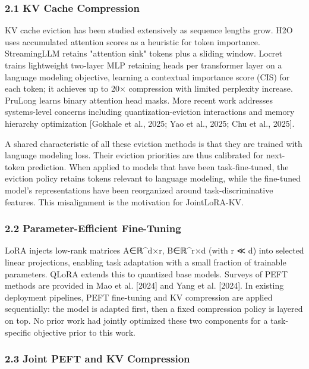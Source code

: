 
\subsubsection{2.1 KV Cache Compression}

KV cache eviction has been studied extensively as sequence lengths grow. H2O \citep{Zhangetal2023} uses accumulated attention scores as a heuristic for token importance. StreamingLLM \citep{Xiaoetal2024} retains "attention sink" tokens plus a sliding window. Locret \citep{Huangetal2024} trains lightweight two-layer MLP retaining heads per transformer layer on a language modeling objective, learning a contextual importance score (CIS) for each token; it achieves up to 20× compression with limited perplexity increase. PruLong \citep{Princeton2024} learns binary attention head masks. More recent work addresses systems-level concerns including quantization-eviction interactions and memory hierarchy optimization [Gokhale et al., 2025; Yao et al., 2025; Chu et al., 2025].

A shared characteristic of all these eviction methods is that they are trained with language modeling loss. Their eviction priorities are thus calibrated for next-token prediction. When applied to models that have been task-fine-tuned, the eviction policy retains tokens relevant to language modeling, while the fine-tuned model's representations have been reorganized around task-discriminative features. This misalignment is the motivation for JointLoRA-KV.

\subsubsection{2.2 Parameter-Efficient Fine-Tuning}

LoRA \citep{Huetal2022} injects low-rank matrices A∈ℝ^{d×r}, B∈ℝ^{r×d} (with r ≪ d) into selected linear projections, enabling task adaptation with a small fraction of trainable parameters. QLoRA \citep{Dettmersetal2023} extends this to quantized base models. Surveys of PEFT methods are provided in Mao et al. [2024] and Yang et al. [2024]. In existing deployment pipelines, PEFT fine-tuning and KV compression are applied sequentially: the model is adapted first, then a fixed compression policy is layered on top. No prior work had jointly optimized these two components for a task-specific objective prior to this work.

\subsubsection{2.3 Joint PEFT and KV Compression}

